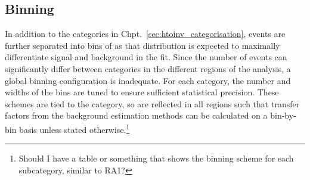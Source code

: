 







\subsection{Binning}
\label{subsec:htoinv_binning}

In addition to the categories in Chpt.~\ref{sec:htoinv_categorisation}, events are further separated into bins of \ptmiss as that distribution is expected to maximally differentiate signal and background in the fit. Since the number of events can significantly differ between categories in the different regions of the analysis, a global binning configuration is inadequate. For each category, the number and widths of the bins are tuned to ensure sufficient statistical precision. These schemes are tied to the category, so are reflected in all regions such that transfer factors from the background estimation methods can be calculated on a bin-by-bin basis unless stated otherwise.\footnote{Should I have a table or something that shows the binning scheme for each subcategory, similar to RA1?}


